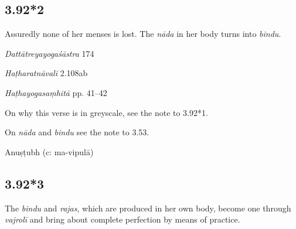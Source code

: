 \begin{ekdosis}
\subsection*{3.92*2}
\begin{translation}[hp03_092_2]
Assuredly none of her menses is lost. The \emph{nāda} in her body turns into \emph{bindu}.
\end{translation}

\begin{sources}[hp03_092_2]
\emph{Dattātreyayogaśāstra} 174
\begin{versinnote}
\end{versinnote}
\end{sources}

\begin{testimonia}[hp03_092_2]
\emph{Haṭharatnāvalī} 2.108ab
\begin{versinnote}
\end{versinnote}

\emph{Haṭhayogasaṃhitā} pp. 41--42
\begin{versinnote}
\end{versinnote}
\end{testimonia}

\begin{philcomm}[hp03_092_2]
On why this verse is in greyscale, see the note to 3.92*1.

On \emph{nāda} and \emph{bindu} see the note to 3.53. 
%
\end{philcomm}

\begin{metre}[hp03_092_2]
Anuṣṭubh (c: ma-vipulā)
\end{metre}

\subsection*{3.92*3}
\begin{translation}[hp03_092_3]
The \emph{bindu} and \emph{rajas}, which are produced in her own body, become one through \emph{vajrolī} and bring about complete perfection by means of practice.%
\end{translation}


\end{ekdosis}
